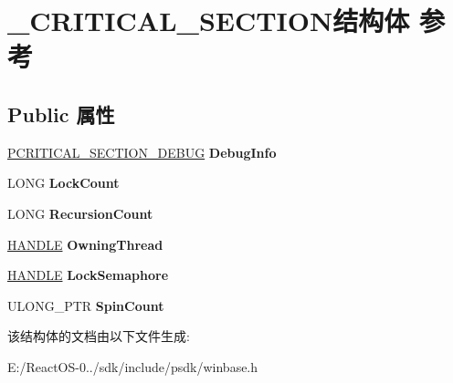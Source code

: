 \hypertarget{struct___c_r_i_t_i_c_a_l___s_e_c_t_i_o_n}{}\section{\+\_\+\+C\+R\+I\+T\+I\+C\+A\+L\+\_\+\+S\+E\+C\+T\+I\+O\+N结构体 参考}
\label{struct___c_r_i_t_i_c_a_l___s_e_c_t_i_o_n}
\subsection*{Public 属性}
\begin{DoxyCompactItemize}
\item 
\mbox{\label{struct___c_r_i_t_i_c_a_l___s_e_c_t_i_o_n_aa43c7f0b41e774d480dbe4c4bfa7bb63}} 
\hyperlink{struct___c_r_i_t_i_c_a_l___s_e_c_t_i_o_n___d_e_b_u_g}{P\+C\+R\+I\+T\+I\+C\+A\+L\+\_\+\+S\+E\+C\+T\+I\+O\+N\+\_\+\+D\+E\+B\+UG} {\bfseries Debug\+Info}
\item 
\mbox{\label{struct___c_r_i_t_i_c_a_l___s_e_c_t_i_o_n_aaf375990964ff124001e8dc3fe86a352}} 
L\+O\+NG {\bfseries Lock\+Count}
\item 
\mbox{\label{struct___c_r_i_t_i_c_a_l___s_e_c_t_i_o_n_a90672204aedbc44f2766cd44bcb9918f}} 
L\+O\+NG {\bfseries Recursion\+Count}
\item 
\mbox{\label{struct___c_r_i_t_i_c_a_l___s_e_c_t_i_o_n_ad53519d96c63c8a25372e32471665543}} 
\hyperlink{interfacevoid}{H\+A\+N\+D\+LE} {\bfseries Owning\+Thread}
\item 
\mbox{\label{struct___c_r_i_t_i_c_a_l___s_e_c_t_i_o_n_ab54221454c1b15bc87910166a911cf68}} 
\hyperlink{interfacevoid}{H\+A\+N\+D\+LE} {\bfseries Lock\+Semaphore}
\item 
\mbox{\label{struct___c_r_i_t_i_c_a_l___s_e_c_t_i_o_n_a32aa5de983b8cd918a43a6935c901d00}} 
U\+L\+O\+N\+G\+\_\+\+P\+TR {\bfseries Spin\+Count}
\end{DoxyCompactItemize}


该结构体的文档由以下文件生成\+:\begin{DoxyCompactItemize}
\item 
E\+:/\+React\+O\+S-\/0../sdk/include/psdk/winbase.\+h\end{DoxyCompactItemize}
